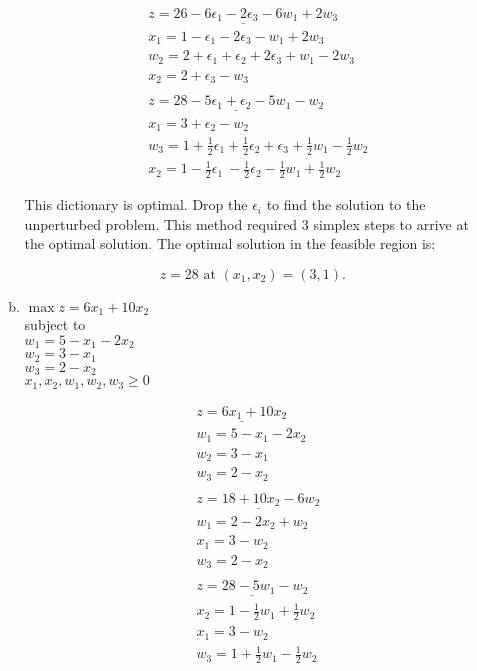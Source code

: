 \documentclass{article}
\begin{document}
\begin{enumerate}
\begin{enumerate}[a)]
\begin{align*}
&\underline{z = 26 - 6\epsilon_1 - 2\epsilon_3 - 6w_1 + 2w_3} \\
&x_1 = 1 - \epsilon_1 - 2 \epsilon_3  - w_1 + 2w_3 \\
&w_2 = 2 + \epsilon_1 + \epsilon_2 + 2\epsilon_3 + w_1 - 2w_3\\
& x_2 = 2 + \epsilon_3 - w_3 \\
&\\
&\underline{z = 28 - 5\epsilon_1 + \epsilon_2 - 5w_1 -w_2} \\
&x_1 = 3 + \epsilon_2 - w_2 \\
&w_3 = 1 + \frac{1}{2}\epsilon_1 + \frac{1}{2}\epsilon_2 + \epsilon_3 + \frac{1}{2}w_1 - \frac{1}{2}w_2\\
& x_2 = 1 - \frac{1}{2}\epsilon_1\ - \frac{1}{2}\epsilon_2 - \frac{1}{2}w_1 + \frac{1}{2}w_2\
\end{align*}


This dictionary is optimal. Drop the $\epsilon_i$ to find the solution to the unperturbed problem. This method required 3 simplex steps to arrive at the optimal solution. The optimal solution in the feasible region is:

$$
\boxed{ z = 28 \text{ at }
(x_1, x_2) =  (3,1).}
$$

\item

$\max z = 6x_1 + 10x_2$\\
subject to \\
$w_1 = 5  - x_1 - 2x_2$\\
$w_2 = 3 - x_1$ \\
$w_3 = 2  - x_2$ \\
$x_1, x_2, w_1, w_2, w_3 \geq 0$

\begin{align*}
&\underline{z = 6x_1 + 10x_2} \\
&w_1 = 5  - x_1 - 2x_2 \\
&w_2 = 3 - x_1\\
& w_3 = 2  - x_2 \\
&\\
&\underline{z = 18 + 10x_2 - 6w_2} \\
&w_1 = 2 - 2x_2  + w_2 \\
&x_1 = 3 - w_2\\
& w_3 = 2 - x_2 \\
&\\
&\underline{z = 28  - 5w_1 - w_2} \\
&x_2 = 1  -  \frac{1}{2}w_1 + \frac{1}{2} w_2 \\
&x_1 = 3 - w_2\\
& w_3 = 1 + \frac{1}{2}w_1 - \frac{1}{2} w_2 \\
&\\
\end{align*}


\end{enumerate}
\end{enumerate}
\end{document}
